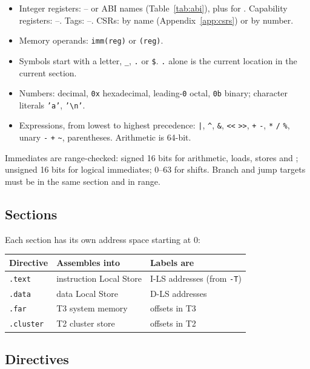 \begin{itemize}
\item Integer registers: -- or ABI names (Table~\ref{tab:abi}), plus  for
  . Capability registers: --. Tags: --. CSRs: by name
  (Appendix~\ref{app:csrs}) or by number.
\item Memory operands: \texttt{imm(reg)} or \texttt{(reg)}.
\item Symbols start with a letter, \texttt{\_}, \texttt{.} or \texttt{\$}. \texttt{.} alone is the
  current location in the current section.
\item Numbers: decimal, \texttt{0x} hexadecimal, leading-\texttt{0} octal, \texttt{0b} binary; character
  literals \texttt{'a'}, \texttt{'\textbackslash n'}.
\item Expressions, from lowest to highest precedence: \texttt{|}, \texttt{\textasciicircum},
  \texttt{\&}, \texttt{<<} \texttt{>>}, \texttt{+} \texttt{-}, \texttt{*} \texttt{/} \texttt{\%}, unary
  \texttt{-} \texttt{+} \texttt{\textasciitilde}, parentheses. Arithmetic is 64-bit.
\end{itemize}

Immediates are range-checked: signed 16 bits for arithmetic, loads, stores and ; unsigned
16 bits for logical immediates; 0--63 for shifts. Branch and jump targets must be in the same section
and in range.

\subsection{Sections}
Each section has its own address space starting at 0:

\begin{center}\small
\begin{tabular}{@{}l l l@{}}
\toprule
\textbf{Directive} & \textbf{Assembles into} & \textbf{Labels are}\\\midrule
\texttt{.text} & instruction Local Store & I-LS addresses (from \texttt{-T})\\
\texttt{.data} & data Local Store & D-LS addresses\\
\texttt{.far} & T3 system memory & offsets in T3\\
\texttt{.cluster} & T2 cluster store & offsets in T2\\
\bottomrule
\end{tabular}
\end{center}

\subsection{Directives}

